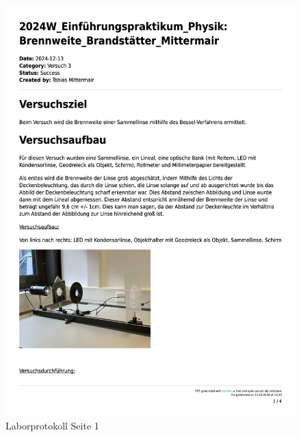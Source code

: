 \documentclass[a4paper,12pt]{article}
\begin{document}
\begin{figure}[H]
    \centering
    \includegraphics[width=1\textwidth]{bilder/Protokoll_Bilder/Protokoll1.png}
    \caption{Laborprotokoll Seite 1}
    \label{fig:Protokoll1}
\end{figure}

\newpage
\end{document}
